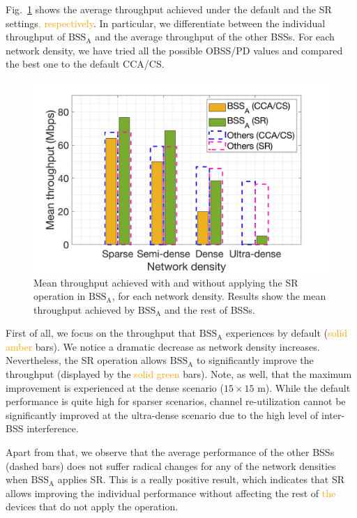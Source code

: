 \documentclass{ieeeaccess}
\begin{document}
Fig.~\ref{fig:SIM_2_1} shows the average throughput achieved under the default and the SR settings\textcolor{orange}{, respectively}. In particular, we differentiate between the individual throughput of $\text{BSS}_\text{A}$ and the average throughput of the other BSSs. For each network density, we have tried all the possible OBSS/PD values and compared the best one to the default CCA/CS.

\begin{figure}[ht!]
	\centering		
	\includegraphics[width=.9\columnwidth]{SIM_2_1}
	\caption{Mean throughput achieved with and without applying the SR operation in $\text{BSS}_\text{A}$, for each network density. Results show the mean throughput achieved by $\text{BSS}_\text{A}$ and the rest of BSSs.}
	\label{fig:SIM_2_1}
\end{figure}

First of all, we focus on the throughput that $\text{BSS}_\text{A}$ experiences by default (\textcolor{orange}{solid amber} bars). We notice a dramatic decrease as network density increases. Nevertheless, the SR operation allows $\text{BSS}_\text{A}$ to significantly improve the throughput (displayed by the \textcolor{orange}{solid green} bars). Note, as well, that the maximum improvement is experienced at the dense scenario ($15\times15$ m). While the default performance is quite high for sparser scenarios, channel re-utilization cannot be significantly improved at the ultra-dense scenario due to the high level of inter-BSS interference.

Apart from that, we observe that the average performance of the other BSSs (dashed bars) does not suffer radical changes for any of the network densities when $\text{BSS}_\text{A}$ applies SR. This is a really positive result, which indicates that SR allows improving the individual performance without affecting the rest of \textcolor{orange}{the} devices that do not apply the operation.
\end{document}
